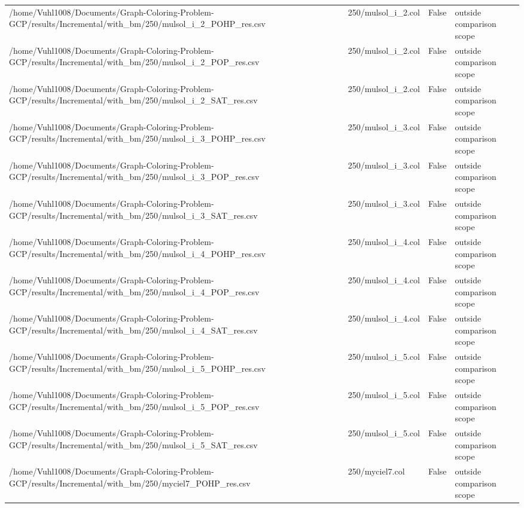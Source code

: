 \begin{table}[htbp]
\begin{tabular}{llll}
/home/Vuhl1008/Documents/Graph-Coloring-Problem-GCP/results/Incremental/with\_bm/250/mulsol\_i\_2\_POHP\_res.csv & 250/mulsol\_i\_2.col & False & outside comparison scope \\
/home/Vuhl1008/Documents/Graph-Coloring-Problem-GCP/results/Incremental/with\_bm/250/mulsol\_i\_2\_POP\_res.csv & 250/mulsol\_i\_2.col & False & outside comparison scope \\
/home/Vuhl1008/Documents/Graph-Coloring-Problem-GCP/results/Incremental/with\_bm/250/mulsol\_i\_2\_SAT\_res.csv & 250/mulsol\_i\_2.col & False & outside comparison scope \\
/home/Vuhl1008/Documents/Graph-Coloring-Problem-GCP/results/Incremental/with\_bm/250/mulsol\_i\_3\_POHP\_res.csv & 250/mulsol\_i\_3.col & False & outside comparison scope \\
/home/Vuhl1008/Documents/Graph-Coloring-Problem-GCP/results/Incremental/with\_bm/250/mulsol\_i\_3\_POP\_res.csv & 250/mulsol\_i\_3.col & False & outside comparison scope \\
/home/Vuhl1008/Documents/Graph-Coloring-Problem-GCP/results/Incremental/with\_bm/250/mulsol\_i\_3\_SAT\_res.csv & 250/mulsol\_i\_3.col & False & outside comparison scope \\
/home/Vuhl1008/Documents/Graph-Coloring-Problem-GCP/results/Incremental/with\_bm/250/mulsol\_i\_4\_POHP\_res.csv & 250/mulsol\_i\_4.col & False & outside comparison scope \\
/home/Vuhl1008/Documents/Graph-Coloring-Problem-GCP/results/Incremental/with\_bm/250/mulsol\_i\_4\_POP\_res.csv & 250/mulsol\_i\_4.col & False & outside comparison scope \\
/home/Vuhl1008/Documents/Graph-Coloring-Problem-GCP/results/Incremental/with\_bm/250/mulsol\_i\_4\_SAT\_res.csv & 250/mulsol\_i\_4.col & False & outside comparison scope \\
/home/Vuhl1008/Documents/Graph-Coloring-Problem-GCP/results/Incremental/with\_bm/250/mulsol\_i\_5\_POHP\_res.csv & 250/mulsol\_i\_5.col & False & outside comparison scope \\
/home/Vuhl1008/Documents/Graph-Coloring-Problem-GCP/results/Incremental/with\_bm/250/mulsol\_i\_5\_POP\_res.csv & 250/mulsol\_i\_5.col & False & outside comparison scope \\
/home/Vuhl1008/Documents/Graph-Coloring-Problem-GCP/results/Incremental/with\_bm/250/mulsol\_i\_5\_SAT\_res.csv & 250/mulsol\_i\_5.col & False & outside comparison scope \\
/home/Vuhl1008/Documents/Graph-Coloring-Problem-GCP/results/Incremental/with\_bm/250/myciel7\_POHP\_res.csv & 250/myciel7.col & False & outside comparison scope \\

\end{tabular}
\end{table}
